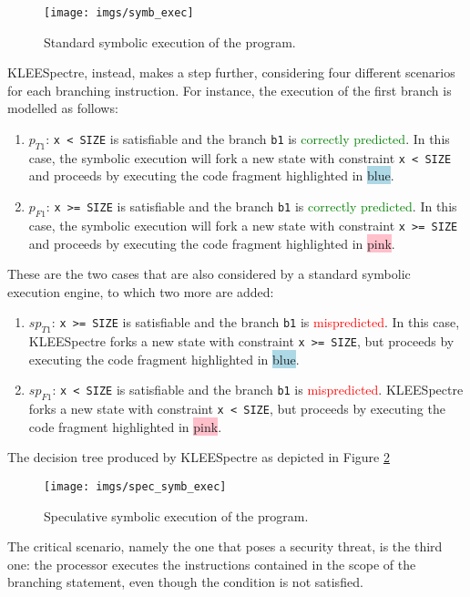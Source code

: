 \documentclass[12pt,a4paper]{book}
\theoremstyle{definition}
\begin{document}
	\begin{figure}[!h]
		\centering
		\texttt{[image: imgs/symb\_exec]}
		\caption{Standard symbolic execution of the program.}
		\label{fig:standars_symb_exec}
	\end{figure}
	KLEESpectre, instead, makes a step further, considering four different scenarios for each branching instruction. For instance, the execution of the first branch is modelled as follows: 
	\begin{enumerate}
		\item $p_{T1}$: \texttt{x < SIZE} is satisfiable and the branch \texttt{b1} is \textcolor{green}{correctly predicted}. In this case, the symbolic execution will fork a new state with constraint \texttt{x < SIZE} and proceeds by executing the code fragment highlighted in \colorbox{lightblue}{blue}.
		\item $p_{F1}$: \texttt{x >= SIZE} is satisfiable and the branch \texttt{b1} is \textcolor{green}{correctly predicted}. In this case, the symbolic execution will fork a new state with constraint \texttt{x >= SIZE} and proceeds by executing the code fragment highlighted in \colorbox{pink}{pink}.
	\end{enumerate}
	These are the two cases that are also considered by a standard symbolic execution engine, to which two more are added:
	\begin{enumerate}[resume]
		\item $sp_{T1}$: \texttt{x >= SIZE} is satisfiable and the branch \texttt{b1} is \textcolor{red}{mispredicted}. In this case, KLEESpectre forks a new state with constraint \texttt{x >= SIZE}, but proceeds by executing the code fragment highlighted in \colorbox{lightblue}{blue}.
		\item $sp_{F1}$: \texttt{x < SIZE} is satisfiable and the branch \texttt{b1} is \textcolor{red}{mispredicted}. KLEESpectre forks a new state with constraint \texttt{x < SIZE}, but proceeds by executing the code fragment highlighted in \colorbox{pink}{pink}.
	\end{enumerate}
	The decision tree produced by KLEESpectre as depicted in Figure \ref{fig:spec_symb_exec}
	
	\begin{figure}[!h]
		\centering
		\texttt{[image: imgs/spec\_symb\_exec]}
		\caption{Speculative symbolic execution of the program.}
		\label{fig:spec_symb_exec}
	\end{figure}
	
	The critical scenario, namely the one that poses a security threat, is the third one: the processor executes the instructions contained in the scope of the branching statement, even though the condition is not satisfied. 
	
\end{document}
